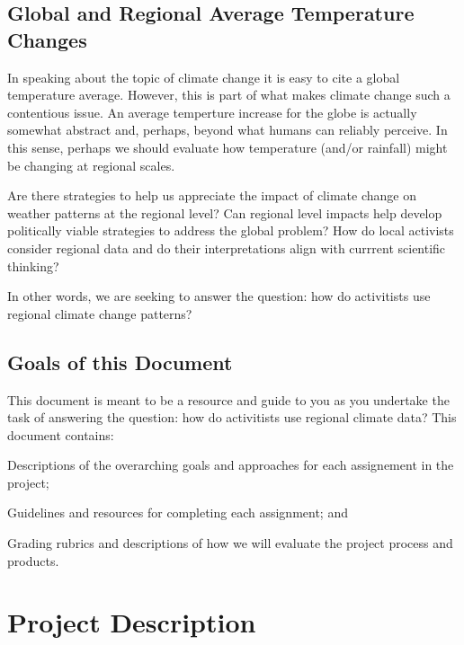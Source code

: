 \documentclass{article}\usepackage[]{graphicx}\usepackage[]{color}
\newenvironment{enumerate*}%
  {\begin{enumerate}%
    \setlength{\itemsep}{0pt}%
    \setlength{\parskip}{0pt}}%
  {\end{enumerate}}
\begin{document}
\subsection{Global and Regional Average Temperature Changes}

In speaking about the topic of climate change it is easy to cite a global temperature average. However, this is part of what makes climate change such a contentious issue. An average temperture increase for the globe is actually somewhat abstract and, perhaps, beyond what humans can reliably perceive. In this sense, perhaps we should evaluate how temperature (and/or rainfall) might be changing at regional scales. 

Are there strategies to help us appreciate the impact of climate change on weather patterns at the regional level? Can regional level impacts help develop politically viable strategies to address the global problem? How do local activists consider regional data and do their interpretations align with currrent scientific thinking?


In other words, we are seeking to answer the question: how do activitists use regional climate change patterns?

\subsection{Goals of this Document}

This document is meant to be a resource and guide to you as you undertake the task of answering the question: how do activitists use regional climate data? This document contains:

\begin{enumerate*}
  \item Descriptions of the overarching goals and approaches for each assignement in the project;
  \item Guidelines and resources for completing each assignment; and
  \item Grading rubrics and descriptions of how we will evaluate the project process and products.
\end{enumerate*}

\section{Project Description}
\end{document}

